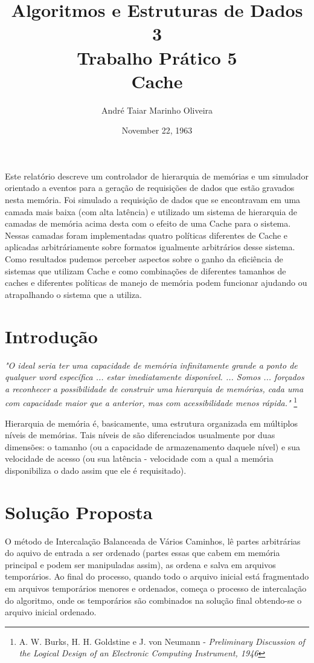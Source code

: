 \documentclass[12pt]{article}
\title{Algoritmos e Estruturas de Dados 3 \\ Trabalho Prático 5 \\
\huge{Cache}}
\date{November 22, 1963}
\author{André Taiar Marinho Oliveira}
\begin{document}
\maketitle

\begin{resumo}
Este relatório descreve um controlador de hierarquia de memórias e um simulador orientado
a eventos para a geração de requisições de dados que estão gravados nesta memória. Foi simulado 
a requisição de dados que se encontravam em uma camada mais baixa (com alta latência) e utilizado 
um sistema de hierarquia de camadas de memória acima desta com o efeito de uma Cache para o sistema. 
Nessas camadas foram implementadas quatro políticas diferentes de Cache e aplicadas arbitráriamente 
sobre formatos igualmente arbitrários desse sistema. Como resultados pudemos perceber aspectos sobre 
o ganho da eficiência de sistemas que utilizam Cache e como combinações de diferentes tamanhos de caches 
e diferentes políticas de manejo de memória podem funcionar ajudando ou atrapalhando o sistema que a 
utiliza.
\end{resumo}

\section{Introdução}
\textit{"O ideal seria ter uma capacidade de memória infinitamente grande a ponto de qualquer word
específica ... estar imediatamente disponível. ... Somos ... forçados a reconhecer a possibilidade de 
construir uma hierarquia de memórias, cada uma com capacidade maior que a anterior, mas com acessibilidade
menos rápida."} \footnote{A. W. Burks, H. H. Goldstine e J. von Neumann - \textit{Preliminary Discussion of the 
Logical Design of an Electronic Computing Instrument, 1946}}

Hierarquia de memória é, basicamente, uma estrutura organizada em múltiplos níveis de memórias. Tais níveis 
de são diferenciados usualmente por duas dimensões: o tamanho (ou a capacidade de armazenamento daquele
nível) e sua velocidade de acesso (ou sua latência - velocidade com a qual a memória disponibiliza o dado 
assim que ele é requisitado).


\section{Solução Proposta}
\label{solucao_proposta}

O método de Intercalação Balanceada de Vários Caminhos, lê partes arbitrárias do 
aquivo de entrada a ser ordenado (partes essas que cabem em memória principal e 
podem ser manipuladas assim), as ordena e salva em arquivos temporários. Ao final 
do processo, quando todo o arquivo inicial está fragmentado em arquivos temporários
menores e ordenados, começa o processo de intercalação do algoritmo, onde os 
temporários são combinados na solução final obtendo-se o arquivo inicial ordenado.
\end{document}
